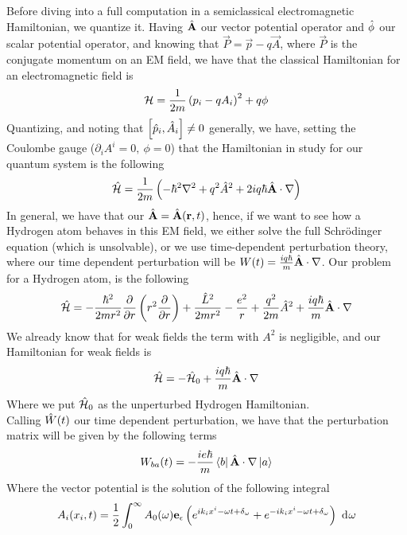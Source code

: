 \documentclass[../qm.tex]{subfiles}
\begin{document}
	Before diving into a full computation in a semiclassical electromagnetic Hamiltonian, we quantize it. Having $\hat{\mathbf{A}}$ our vector potential operator and $\hat{\phi}$ our scalar potential operator, and knowing that $\vec{P}=\vec{p}-q\vec{A}$, where $\vec{P}$ is the conjugate momentum on an EM field, we have that the classical Hamiltonian for an electromagnetic field is
	\begin{equation}
		\mathcal{H}=\frac{1}{2m}\left( p_i-qA_i \right)^2+q\phi
		\label{eq:classemham}
	\end{equation}
	Quantizing, and noting that $\comm{\opr{p}_i}{\opr{A}_i}\ne0$ generally, we have, setting the Coulombe gauge ($\partial_iA^i=0,\ \phi=0$) that the Hamiltonian in study for our quantum system is the following
	\begin{equation}
		\hat{\mathcal{H}}=\frac{1}{2m}\left( -\hbar^2\nabla^2+q^2\hat{A}^2+2iq\hbar\hat{\mathbf{A}}\cdot\nabla\right)
		\label{eq:qhamemfield}
	\end{equation}
	In general, we have that our $\hat{\mathbf{A}}=\hat{\mathbf{A}}(\mathbf{r},t)$, hence, if we want to see how a Hydrogen atom behaves in this EM field, we either solve the full Schrödinger equation (which is unsolvable), or we use time-dependent perturbation theory, where our time dependent perturbation will be $W(t)=\frac{iq\hbar}{m}\hat{\mathbf{A}}\cdot\nabla$. Our problem for a Hydrogen atom, is the following
	\begin{equation}
		\hat{\mathcal{H}}=-\frac{\hbar^2}{2mr^2}\pdv{r}\left( r^2\pdv{r} \right)+\frac{\hat{L}^2}{2mr^2}-\frac{e^2}{r}+\frac{q^2}{2m}\hat{A}^2+\frac{iq\hbar}{m}\hat{\mathbf{A}}\cdot\nabla
		\label{eq:fullpert}
	\end{equation}
	We already know that for weak fields the term with $A^2$ is negligible, and our Hamiltonian for weak fields is
	\begin{equation}
		\hat{\mathcal{H}}=-\hat{\mathcal{H}}_0+\frac{iq\hbar}{m}\hat{\mathbf{A}}\cdot\nabla
		\label{eq:weakfieldemham}
	\end{equation}
	Where we put $\hat{\mathcal{H}}_0$ as the unperturbed Hydrogen Hamiltonian.\\
	Calling $\hat{W}(t)$ our time dependent perturbation, we have that the perturbation matrix will be given by the following terms
	\begin{equation}
		W_{ba}(t)=-\frac{ie\hbar}{m}\bra{b}\hat{\mathbf{A}}\cdot\nabla\ket{a}
		\label{eq:empertmatrix}
	\end{equation}
	Where the vector potential is the solution of the following integral
	\begin{equation}
		A_i(x_i,t)=\frac{1}{2}\int_{0}^{\infty}A_0(\omega)\mathbf{e}_{\epsilon}\left( e^{ik_ix^i-\omega t+\delta_{\omega}}+e^{-ik_ix^i-\omega t +\delta_{\omega}} \right)\ \mathrm{d}^{}\omega
		\label{eq:vectorpotentialem}
	\end{equation}
\end{document}
